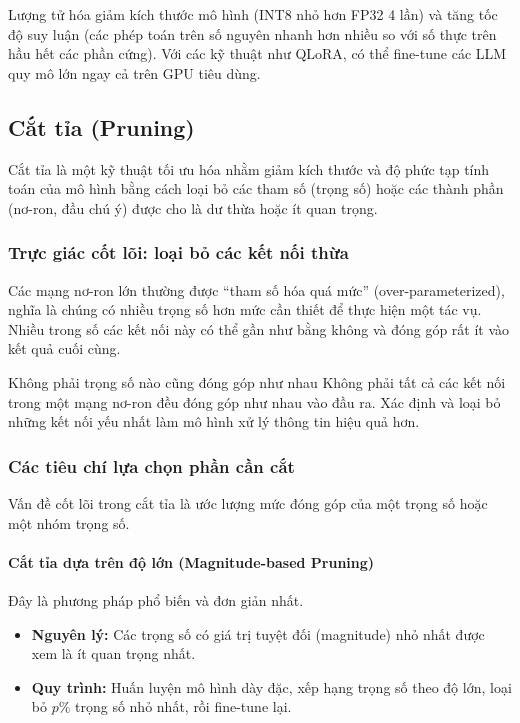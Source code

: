 Lượng tử hóa giảm kích thước mô hình (INT8 nhỏ hơn FP32 4 lần) và tăng tốc độ suy luận (các phép toán trên số nguyên nhanh hơn nhiều so với số thực trên hầu hết các phần cứng). Với các kỹ thuật như QLoRA, có thể fine-tune các LLM quy mô lớn ngay cả trên GPU tiêu dùng.

\subsection{Cắt tỉa (Pruning)}
\label{ssec:pruning}
Cắt tỉa là một kỹ thuật tối ưu hóa nhằm giảm kích thước và độ phức tạp tính toán của mô hình bằng cách loại bỏ các tham số (trọng số) hoặc các thành phần (nơ-ron, đầu chú ý) được cho là dư thừa hoặc ít quan trọng.

\subsubsection{Trực giác cốt lõi: loại bỏ các kết nối thừa}
Các mạng nơ-ron lớn thường được “tham số hóa quá mức” (over-parameterized), nghĩa là chúng có nhiều trọng số hơn mức cần thiết để thực hiện một tác vụ. Nhiều trong số các kết nối này có thể gần như bằng không và đóng góp rất ít vào kết quả cuối cùng.

\begin{keyidea}{Không phải trọng số nào cũng đóng góp như nhau}
	Không phải tất cả các kết nối trong một mạng nơ-ron đều đóng góp như nhau vào đầu ra. Xác định và loại bỏ những kết nối yếu nhất làm mô hình xử lý thông tin hiệu quả hơn.
\end{keyidea}

\subsubsection{Các tiêu chí lựa chọn phần cần cắt}
Vấn đề cốt lõi trong cắt tỉa là ước lượng mức đóng góp của một trọng số hoặc một nhóm trọng số.

\paragraph{Cắt tỉa dựa trên độ lớn (Magnitude-based Pruning)}
Đây là phương pháp phổ biến và đơn giản nhất.
\begin{itemize}
	\item \textbf{Nguyên lý:} Các trọng số có giá trị tuyệt đối (magnitude) nhỏ nhất được xem là ít quan trọng nhất.
	\item \textbf{Quy trình:} Huấn luyện mô hình dày đặc, xếp hạng trọng số theo độ lớn, loại bỏ $p\%$ trọng số nhỏ nhất, rồi fine-tune lại.
\end{itemize}

